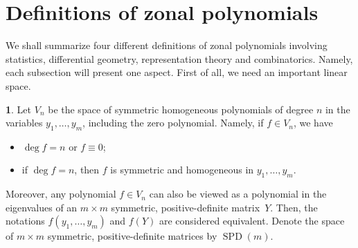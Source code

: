 \documentclass{mathincs}
\numberwithin{equation}{section}
\numberwithin{figure}{section}
\theoremstyle{plain}
\theoremstyle{definition}
\newtheorem{defn}[thm]{\protect\definitionname}
\theoremstyle{remark}
\theoremstyle{plain}
\theoremstyle{definition}
\theoremstyle{plain}
\theoremstyle{plain}
\newcommand{\SPD}{\operatorname{SPD}}
\providecommand{\definitionname}{Definition}
\begin{document}
\section{\label{sec:DEFS}Definitions of zonal polynomials}

We shall summarize four different definitions of zonal polynomials
involving statistics, differential geometry, representation theory
and combinatorics. Namely, each subsection will present one aspect. 
First of all, we need an important linear space.
\begin{defn}
Let $V_{n}$ be the space of symmetric homogeneous polynomials of
degree $n$ in the variables $y_{1},\ldots,y_{m}$, including the zero polynomial.
Namely, if $f\in V_{n}$, we have 
\begin{itemize}
\item $\deg f=n$ or $f\equiv0$;
\item if $\deg f=n$, then $f$ is symmetric and homogeneous in $y_{1},\ldots,y_{m}$.
\end{itemize}
Moreover, any polynomial $f\in V_{n}$ can also be viewed as a polynomial
in the eigenvalues of an $m\times m$ symmetric, positive-definite matrix~$Y$.
Then, the notations $f(y_1,\dots,y_m)$ and $f(Y)$ are considered equivalent.
Denote the space of $m\times m$ symmetric, positive-definite matrices
by $\SPD(m)$. 
\end{defn}
\end{document}
